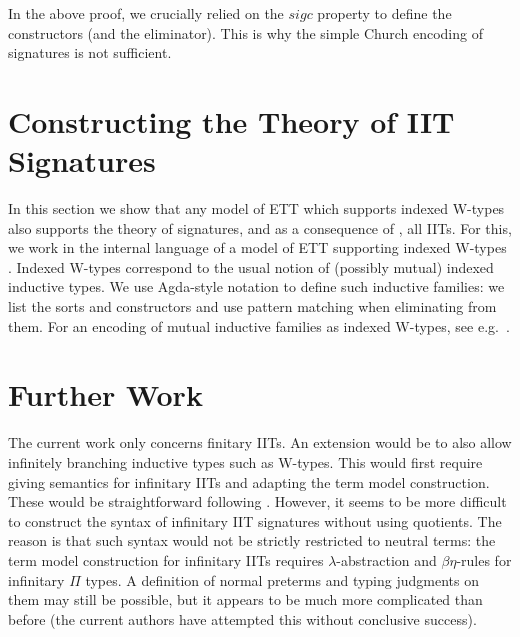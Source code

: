 \documentclass[a4paper,UKenglish,cleveref, autoref]{lipics-v2019}
\begin{document}
\begin{remark}\label{remark:sigc}
  In the above proof, we crucially relied on the ${sigc}$ property to
  define the constructors (and the eliminator). This is why the simple
  Church encoding of signatures is not sufficient.
\end{remark}


\section{Constructing the Theory of IIT Signatures}
\label{sec:ambroise}

In this section we show that any model of ETT which supports indexed W-types
also supports the theory of signatures, and as a consequence of
, all IITs. For this, we work in the internal language of a
model of ETT supporting indexed W-types \cite{indexedcont}. Indexed W-types
correspond to the usual notion of (possibly mutual) indexed inductive types. We
use Agda-style notation to define such inductive families: we list the sorts and
constructors and use pattern matching when eliminating from them. For an
encoding of mutual inductive families as indexed W-types, see
e.g.\ \cite{mutual}.




\section{Further Work}
\label{sec:conclusions}

The current work only concerns finitary IITs. An extension would be to
also allow infinitely branching inductive types such as W-types. This
would first require giving semantics for infinitary IITs and adapting
the term model construction. These would be straightforward following
\cite{large_inf_qiit}. However, it seems to be more difficult to
construct the syntax of infinitary IIT signatures without using
quotients. The reason is that such syntax would not be strictly
restricted to neutral terms: the term model construction for
infinitary IITs requires $\lambda$-abstraction and $\beta\eta$-rules
for infinitary $\Pi$ types. A definition of normal preterms and typing
judgments on them may still be possible, but it appears to be much
more complicated than before (the current authors have attempted this
without conclusive success).
\end{document}

